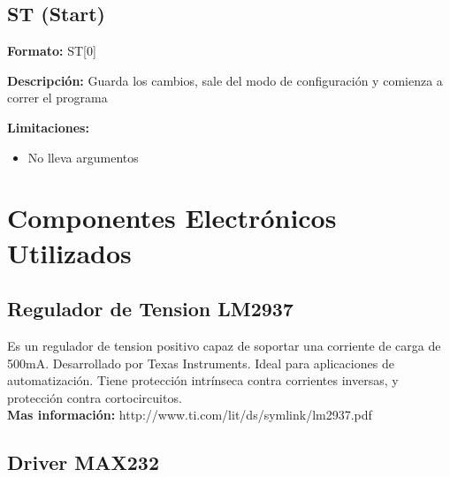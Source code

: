 \documentclass{article}
\theoremstyle{definition}
\theoremstyle{remark}
\begin{document}
\subsection{ST (Start)} %
\label{sub:st_start}


\textbf{Formato:} ST[0]

\textbf{Descripci\'on:}
Guarda los cambios, sale del modo de configuración y comienza a correr el programa

\textbf{Limitaciones:}
\begin{itemize}
  \item No lleva argumentos
\end{itemize}




\section{Componentes Electrónicos Utilizados} %
\label{sec:componentes_electronicos_utilizados}







\subsection{Regulador de Tension LM2937} %
\label{sub:regulador_de_tension_lm2937}

Es un regulador de tension positivo capaz de soportar una corriente de carga de 500mA. Desarrollado por Texas Instruments. Ideal para aplicaciones de automatización. Tiene protección intrínseca contra corrientes inversas, y protección contra cortocircuitos. \\

\textbf{Mas información:} http://www.ti.com/lit/ds/symlink/lm2937.pdf


\subsection{Driver MAX232} %
\label{sub:driver_max232}
\end{document}
